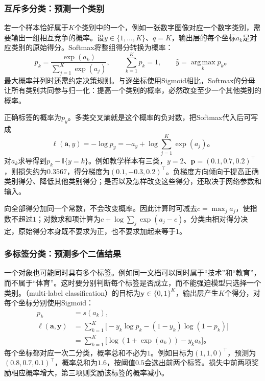 \subsubsection{互斥多分类：预测一个类别}
\label{sec:ffn-output-multiclass}

若一个样本恰好属于$K$个类别中的一个，例如一张数字图像对应一个数字类别，需要输出一组相互竞争的概率。设$y\in\{1,\ldots,K\}$、$q=K$，输出层的每个坐标$a_k$是对应类别的原始得分。Softmax将整组得分转换为概率：
\begin{equation}
  p_k=\frac{\exp(a_k)}{\sum_{j=1}^{K}\exp(a_j)},
  \qquad \sum_{k=1}^{K}p_k=1,\qquad
  \widehat y=\operatorname*{arg\,max}_{k}p_k\text{。}
  \label{eq:ffn-multiclass-output}
\end{equation}
最大概率并列时还需约定决策规则。与逐坐标使用Sigmoid相比，Softmax的分母让所有类别共同参与归一化：提高一个类别的概率，必然改变至少一个其他类别的概率。

正确标签的概率为$p_y$。多类交叉熵就是这个概率的负对数，把Softmax代入后可写成
\begin{equation}
  \ell(\bm{a},y)=-\log p_y
  =-a_y+\log\sum_{j=1}^{K}\exp(a_j)\text{。}
  \label{eq:ffn-multiclass-cross-entropy}
\end{equation}
对$a_k$求导得到$p_k-\mathbb{I}\{y=k\}$。例如教学样本有三类，$y=2$、$\bm{p}=(0.1,0.7,0.2)^{\top}$，则损失约为$0.3567$，得分梯度为$(0.1,-0.3,0.2)^{\top}$。负梯度方向倾向于提高正确类别得分、降低其他类别得分；是否以及怎样改变这些得分，还取决于网络参数和输入。

向全部得分加同一个常数，不会改变概率。因此计算时可减去$c=\max_j a_j$，使指数不超过$1$；对数求和项计算为$c+\log\sum_j\exp(a_j-c)$。分类由相对得分决定，原始得分本身既不要求为正，也不要求加起来等于$1$。

\subsubsection{多标签分类：预测多个二值结果}
\label{sec:ffn-output-multilabel}

一个对象也可能同时具有多个标签。例如同一文档可以同时属于“技术”和“教育”，而不属于“体育”。这时要分别判断每个标签是否成立，而不能强迫模型只选择一个类别。（multi-label classification）的目标为$\bm{y}\in\{0,1\}^{K}$，输出层产生$K$个得分，对每个坐标分别使用Sigmoid：
\begin{equation}
  \begin{aligned}
    p_k&=s(a_k),\\
    \ell(\bm{a},\bm{y})
      &=\sum_{k=1}^{K}\bigl[-y_k\log p_k-(1-y_k)\log(1-p_k)\bigr]\\
      &=\sum_{k=1}^{K}\bigl[\log(1+\exp(a_k))-y_k a_k\bigr]\text{。}
  \end{aligned}
  \label{eq:ffn-multilabel-loss}
\end{equation}
每个坐标都对应一次二分类，概率总和不必为$1$。例如目标为$(1,1,0)^{\top}$，预测为$(0.8,0.7,0.1)^{\top}$，概率总和为$1.6$，按阈值$0.5$会选出前两个标签。损失中前两项奖励相应概率增大，第三项则奖励该标签的概率减小。

